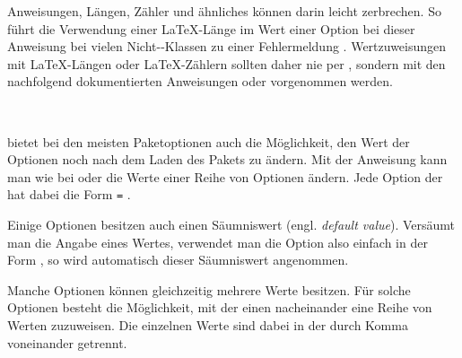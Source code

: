 %
Anweisungen, Längen, Zähler und ähnliches können darin leicht zerbrechen. So
führt die Verwendung einer \LaTeX-Länge im Wert einer Option bei dieser
Anweisung bei vielen Nicht-\KOMAScript-Klassen zu einer Fehlermeldung%
%
. Wertzuweisungen mit \LaTeX-Längen oder \LaTeX-Zählern sollten daher nie per
, sondern mit den nachfolgend dokumentierten Anweisungen
 oder 
vorgenommen werden.  \EndIndexGroup


\begin{Declaration}
  \\
\end{Declaration}
\KOMAScript{} bietet bei den meisten
Paketoptionen
auch die Möglichkeit, den Wert der Optionen noch nach dem Laden
des Pakets zu ändern. Mit der Anweisung  kann man wie bei
 oder
 die Werte einer Reihe von
Optionen ändern. Jede Option der  hat dabei die Form
\texttt{=}%
.

Einige Optionen besitzen auch einen Säumniswert (engl. \emph{default
  value}). Versäumt man die Angabe eines Wertes, verwendet man die Option also
einfach in der Form , so wird automatisch dieser Säumniswert
angenommen.

Manche Optionen können gleichzeitig mehrere Werte besitzen. Für solche
Optionen besteht die Möglichkeit, mit  der einen
 nacheinander eine Reihe von Werten zuzuweisen. Die einzelnen
Werte sind dabei in der
 durch Komma
voneinander getrennt.

